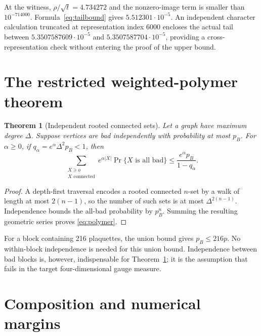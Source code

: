 \documentclass[11pt]{article}
\newtheorem{theorem}{Theorem}[section]
\theoremstyle{definition}
\begin{document}
At the witness, $\rho/\sqrt t=4.734272$ and the nonzero-image term is smaller
than $10^{-714000}$.  Formula~\eqref{eq:tailbound} gives
$5.512301\cdot10^{-5}$.  An independent character calculation truncated at
representation index 6000 encloses the actual tail between
$5.3507587609\cdot10^{-5}$ and $5.3507587704\cdot10^{-5}$, providing a
cross-representation check without entering the proof of the upper bound.

\section{The restricted weighted-polymer theorem}\label{sec:polymer}

\begin{theorem}[Independent rooted connected sets]\label{thm:polymer}
Let a graph have maximum degree $\Delta$.  Suppose vertices are bad
independently with probability at most $p_B$.  For $\alpha\ge0$, if
$q_\alpha=e^\alpha\Delta^2p_B<1$, then
\begin{equation}\label{eq:polymer}
 \sum_{\substack{X\ni o\\X\text{ connected}}}
 e^{\alpha|X|}\Pr\{X\text{ is all bad}\}
 \le \frac{e^\alpha p_B}{1-q_\alpha}.
\end{equation}
\end{theorem}

\begin{proof}
A depth-first traversal encodes a rooted connected $n$-set by a walk of
length at most $2(n-1)$, so the number of such sets is at most
$\Delta^{2(n-1)}$.  Independence bounds the all-bad probability by $p_B^n$.
Summing the resulting geometric series proves \eqref{eq:polymer}.
\end{proof}

For a block containing 216 plaquettes, the union bound gives
$p_B\le216p$.  No within-block independence is needed for this union bound.
Independence between bad blocks is, however, indispensable for
Theorem~\ref{thm:polymer}; it is the assumption that fails in the target
four-dimensional gauge measure.

\section{Composition and numerical margins}\label{sec:overlap}
\end{document}
